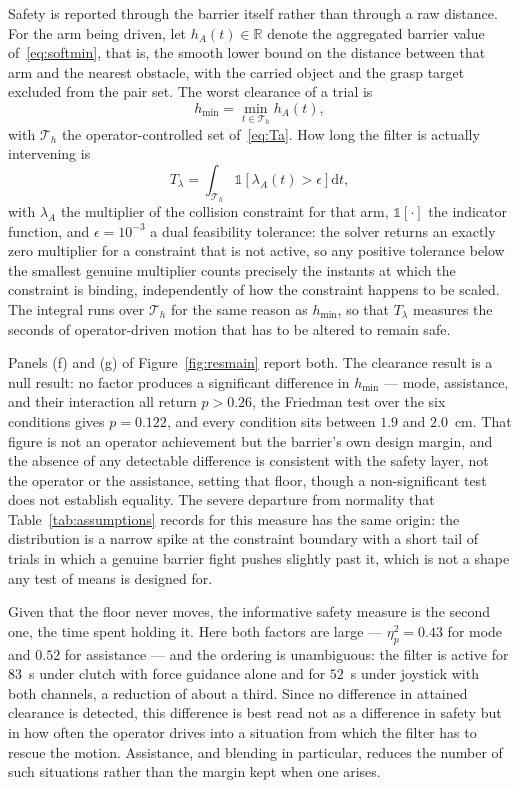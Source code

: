 Safety is reported through the barrier itself rather than through a raw distance. For the arm being driven, let $h_A(t) \in \mathbb{R}$ denote the aggregated barrier value of~\eqref{eq:softmin}, that is, the smooth lower bound on the distance between that arm and the nearest obstacle, with the carried object and the grasp target excluded from the pair set. The worst clearance of a trial is
\begin{equation}
h_{\min} = \min_{t \in \mathcal{T}_h} h_A(t),
\label{eq:mhmin}
\end{equation}
with $\mathcal{T}_h$ the operator-controlled set of~\eqref{eq:Ta}. How long the filter is actually intervening is
\begin{equation}
T_{\lambda} = \int_{\mathcal{T}_h} \mathbb{1}\!\left[\lambda_A(t) > \epsilon\right] \mathrm{d}t,
\label{eq:mTlam}
\end{equation}
with $\lambda_A$ the multiplier of the collision constraint for that arm, $\mathbb{1}[\cdot]$ the indicator function, and $\epsilon = 10^{-3}$ a dual feasibility tolerance: the solver returns an exactly zero multiplier for a constraint that is not active, so any positive tolerance below the smallest genuine multiplier counts precisely the instants at which the constraint is binding, independently of how the constraint happens to be scaled. The integral runs over $\mathcal{T}_h$ for the same reason as $h_{\min}$, so that $T_{\lambda}$ measures the seconds of operator-driven motion that has to be altered to remain safe.

Panels (f) and (g) of Figure~\ref{fig:resmain} report both. The clearance result is a null result: no factor produces a significant difference in $h_{\min}$ --- mode, assistance, and their interaction all return $p > 0.26$, the Friedman test over the six conditions gives $p = 0.122$, and every condition sits between $1.9$ and $2.0$~cm. That figure is not an operator achievement but the barrier's own design margin, and the absence of any detectable difference is consistent with the safety layer, not the operator or the assistance, setting that floor, though a non-significant test does not establish equality. The severe departure from normality that Table~\ref{tab:assumptions} records for this measure has the same origin: the distribution is a narrow spike at the constraint boundary with a short tail of trials in which a genuine barrier fight pushes slightly past it, which is not a shape any test of means is designed for.

Given that the floor never moves, the informative safety measure is the second one, the time spent holding it. Here both factors are large --- $\eta^2_p = 0.43$ for mode and $0.52$ for assistance --- and the ordering is unambiguous: the filter is active for $83$~s under clutch with force guidance alone and for $52$~s under joystick with both channels, a reduction of about a third. Since no difference in attained clearance is detected, this difference is best read not as a difference in safety but in how often the operator drives into a situation from which the filter has to rescue the motion. Assistance, and blending in particular, reduces the number of such situations rather than the margin kept when one arises.



